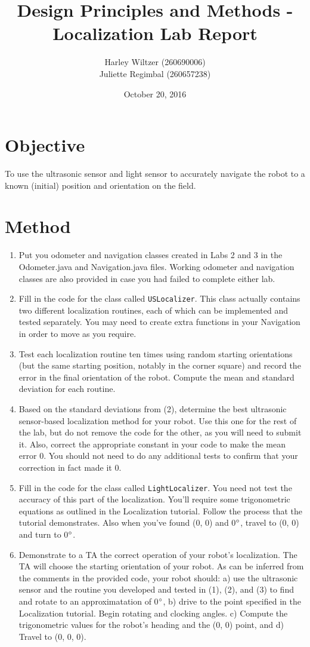 \documentclass[11pt]{article}
\title{Design Principles and Methods - Localization Lab Report}
\author{Harley Wiltzer (260690006)\\Juliette Regimbal (260657238)}
\date{October 20, 2016}
\begin{document}
\maketitle
{}


\section{Objective}
To use the ultrasonic sensor and light sensor to accurately navigate the robot to a known (initial) position and orientation on the field.
\section{Method}
\begin{enumerate}
\item Put you odometer and navigation classes created in Labs 2 and 3 in the Odometer.java and Navigation.java files. Working odometer and navigation classes are also provided in case you had failed to complete either lab.
\item Fill in the code for the class called \texttt{USLocalizer}. This class actually contains two different localization routines, each of which can be implemented and tested separately. You may need to create extra functions in your Navigation in order to move as you require.
\item Test each localization routine ten times using random starting orientations (but the same starting position, notably in the corner square) and record the error in the final orientation of the robot. Compute the mean and standard deviation for each routine.
\item Based on the standard deviations from (2), determine the best ultrasonic sensor-based localization method for your robot. Use this one for the rest of the lab, but do not remove the code for the other, as you will need to submit it. Also, correct the appropriate constant in your code to make the mean error 0. You should not need to do any additional tests to confirm that your correction in fact made it 0.
\item Fill in the code for the class called \texttt{LightLocalizer}. You need not test the accuracy of this part of the localization. You'll require some trigonometric equations as outlined in the Localization tutorial. Follow the process that the tutorial demonstrates. Also when you've found (0, 0) and 0$\degree$, travel to (0, 0) and turn to 0$\degree$.
\item Demonstrate to a TA the correct operation of your robot's localization. The TA will choose the starting orientation of your robot. As can be inferred from the comments in the provided code, your robot should: a) use the ultrasonic sensor and the routine you developed and tested in (1), (2), and (3) to find and rotate to an approximatation of 0$\degree$, b) drive to the point specified in the Localization tutorial. Begin rotating and clocking angles. c) Compute the trigonometric values for the robot's heading and the (0, 0) point, and d) Travel to (0, 0, 0).
\end{enumerate}
\newpage
\end{document}
